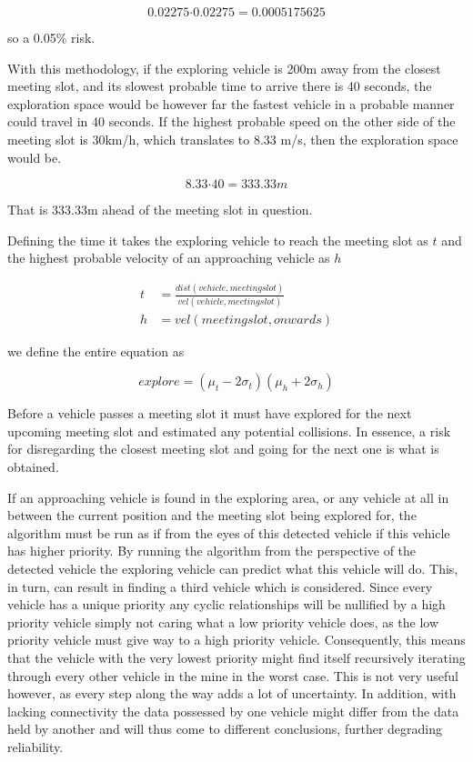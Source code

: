 \documentclass{article}
\begin{document}
			\begin{equation}
				0.02275 \boldsymbol{\cdot} 0.02275 = 0.0005175625
			\end{equation}

			so a 0.05\% risk.

			With this methodology, if the exploring vehicle is 200m away from the closest meeting slot, and its slowest probable time to arrive there is 40 seconds, the exploration space would be however far the fastest vehicle in a probable manner could travel in 40 seconds. If the highest probable speed on the other side of the meeting slot is 30km/h, which translates to 8.33 m/s, then the exploration space would be.

			\begin{equation}
				  8.33 \boldsymbol{\cdot} 40 = 333.33m
  			\end{equation}

			That is 333.33m ahead of the meeting slot in question.

			Defining the time it takes the exploring vehicle to reach the meeting slot as $t$ and the highest probable velocity of an approaching vehicle as $h$

			\begin{align}
				t &= \frac{dist(vehicle, meeting slot)}{vel(vehicle, meeting slot)} \\
				h &= vel(meeting slot, onwards)
			\end{align}

			we define the entire equation as

			\begin{equation}
				explore = (\mu_t - 2\sigma_t) (\mu_h + 2\sigma_h)
			\end{equation}

			Before a vehicle passes a meeting slot it must have explored for the next upcoming meeting slot and estimated any potential collisions. In essence, a risk for disregarding the closest meeting slot and going for the next one is what is obtained.

			If an approaching vehicle is found in the exploring area, or any vehicle at all in between the current position and the meeting slot being explored for, the algorithm must be run as if from the eyes of this detected vehicle if this vehicle has higher priority. By running the algorithm from the perspective of the detected vehicle the exploring vehicle can predict what this vehicle will do. This, in turn, can result in finding a third vehicle which is considered. Since every vehicle has a unique priority any cyclic relationships will be nullified by a high priority vehicle simply not caring what a low priority vehicle does, as the low priority vehicle must give way to a high priority vehicle. Consequently, this means that the vehicle with the very lowest priority might find itself recursively iterating through every other vehicle in the mine in the worst case. This is not very useful however, as every step along the way adds a lot of uncertainty. In addition, with lacking connectivity the data possessed by one vehicle might differ from the data held by another and will thus come to different conclusions, further degrading reliability.
\end{document}
